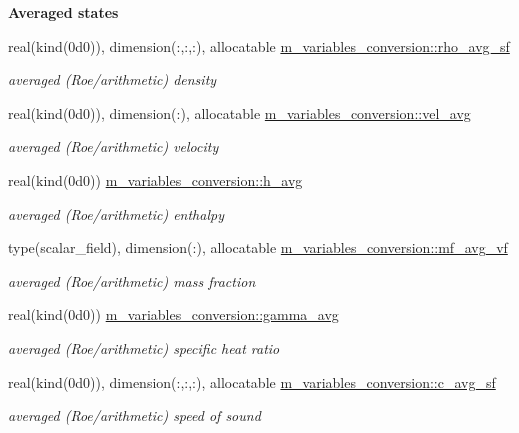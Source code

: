 \begin{Indent}\textbf{ Averaged states}\par
\begin{DoxyCompactItemize}
\item 
real(kind(0d0)), dimension(\+:,\+:,\+:), allocatable \hyperlink{namespacem__variables__conversion_a634c394073f72172798e63327fc4da9f}{m\+\_\+variables\+\_\+conversion\+::rho\+\_\+avg\+\_\+sf}
\begin{DoxyCompactList}\small\item\em averaged (Roe/arithmetic) density \end{DoxyCompactList}\item 
real(kind(0d0)), dimension(\+:), allocatable \hyperlink{namespacem__variables__conversion_a8a9fd6029912bd540f67f414592f52f6}{m\+\_\+variables\+\_\+conversion\+::vel\+\_\+avg}
\begin{DoxyCompactList}\small\item\em averaged (Roe/arithmetic) velocity \end{DoxyCompactList}\item 
real(kind(0d0)) \hyperlink{namespacem__variables__conversion_ac6e02dc63185c34a062b7e8107748479}{m\+\_\+variables\+\_\+conversion\+::h\+\_\+avg}
\begin{DoxyCompactList}\small\item\em averaged (Roe/arithmetic) enthalpy \end{DoxyCompactList}\item 
type(scalar\+\_\+field), dimension(\+:), allocatable \hyperlink{namespacem__variables__conversion_a9ca8440ed6e591b63ef1466c6b46ce5d}{m\+\_\+variables\+\_\+conversion\+::mf\+\_\+avg\+\_\+vf}
\begin{DoxyCompactList}\small\item\em averaged (Roe/arithmetic) mass fraction \end{DoxyCompactList}\item 
real(kind(0d0)) \hyperlink{namespacem__variables__conversion_a3f563ef8c3ca1b8af63de2eb093f8fd6}{m\+\_\+variables\+\_\+conversion\+::gamma\+\_\+avg}
\begin{DoxyCompactList}\small\item\em averaged (Roe/arithmetic) specific heat ratio \end{DoxyCompactList}\item 
real(kind(0d0)), dimension(\+:,\+:,\+:), allocatable \hyperlink{namespacem__variables__conversion_a7c36a0df12279321428e742ac7a71001}{m\+\_\+variables\+\_\+conversion\+::c\+\_\+avg\+\_\+sf}
\begin{DoxyCompactList}\small\item\em averaged (Roe/arithmetic) speed of sound \end{DoxyCompactList}\item 

\end{DoxyCompactItemize}
\end{Indent}
